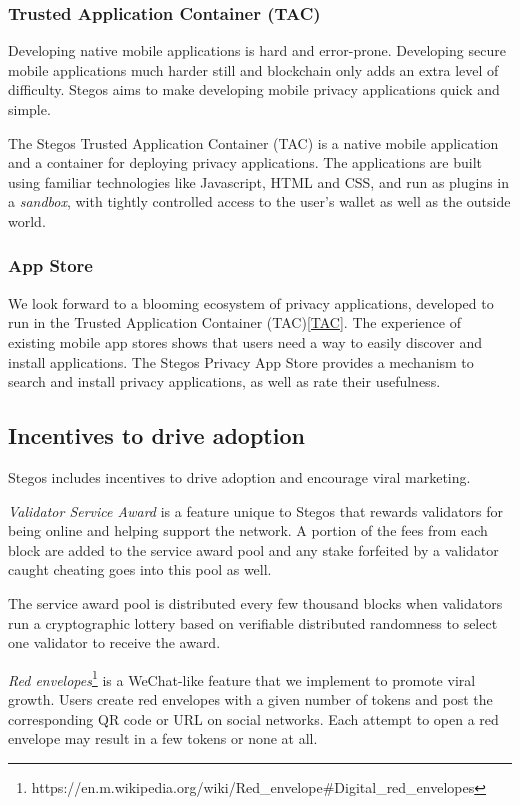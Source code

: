 \documentclass[a4paper, 10pt, conference]{ieeeconf}
\begin{document}
\subsubsection{Trusted Application Container (TAC)}
Developing native mobile applications is hard and error-prone. Developing secure mobile applications much harder still and blockchain only adds an extra level of difficulty. Stegos aims to make developing mobile privacy applications quick and simple. 

The Stegos Trusted Application Container (TAC) is a native mobile application and a container for deploying privacy applications. The applications are built using familiar technologies like Javascript, HTML and CSS, and run as plugins in a \textit{sandbox}, with tightly controlled access to the user's wallet as well as the outside world.

\subsubsection{App Store}
We look forward to a blooming ecosystem of privacy applications, developed to run in the Trusted Application Container (TAC)\ref{TAC}. The experience of existing mobile app stores shows that users need a way to easily discover and install applications. The Stegos Privacy App Store provides a mechanism to search and install privacy applications, as well as rate their usefulness. 

\subsection{Incentives to drive adoption}
Stegos includes incentives to drive adoption and encourage viral marketing. 

\textit{Validator Service Award} is a feature unique to Stegos that rewards validators for being online and helping support the network. A portion of the fees from each block are added to the service award pool and any stake forfeited by a validator caught cheating goes into this pool as well. 

The service award pool is distributed every few thousand blocks when validators run a cryptographic lottery based on verifiable distributed randomness to select one validator to receive the award.

\textit{Red envelopes}\footnote{https://en.m.wikipedia.org/wiki/Red\_envelope\#Digital\_red\_envelopes} is a WeChat-like feature that we implement to promote viral growth. Users create red envelopes with a given number of tokens and post the corresponding QR code or URL on social networks. Each attempt to open a red envelope may result in a few tokens or none at all. 
\end{document}
